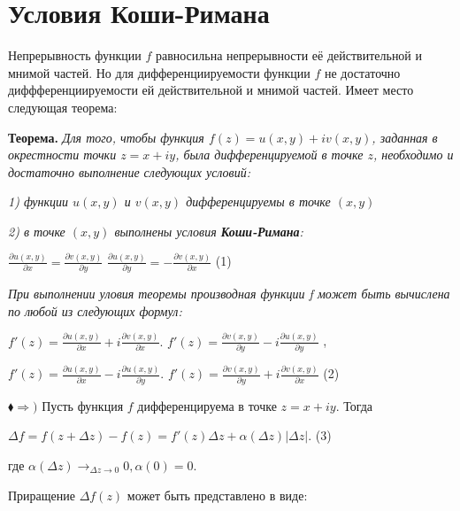 \documentclass[a4paper, 12pt]{report}
\begin{document}
\section{Условия Коши-Римана}
Непрерывность функции $f$ равносильна непрерывности её действительной и мнимой частей. Но для дифференциируемости функции $f$ не достаточно диффференциируемости ей действительной и мнимой частей. Имеет место следующая теорема:
\par\bigskip
\textbf{Теорема.} \quad
\textsl{Для того, чтобы функция $f(z) = u(x, y) + iv(x, y)$, заданная в окрестности точки $z = x + iy$, была дифференцируемой в точке $z$, необходимо и достаточно выполнение следующих условий: }
\par\bigskip
\textsl{1) функции $u(x, y)$ и $v(x, y)$ дифференцируемы в точке $(x, y)$}
\par
\textsl{2) в точке $(x, y)$ выполнены условия \textbf{Коши-Римана}:}
\par\bigskip
\begin{center}
$\frac{\partial u(x, y)}{\partial x} = \frac{\partial v(x, y)}{\partial y}$ \quad $ \frac{\partial u(x, y)}{\partial y} = -\frac{\partial v(x, y)}{\partial x}$ 
\quad(1)
\end{center}
\par\bigskip
\textsl{При выполнении уловия теоремы производная функции f может быть вычислена по любой из следующих формул:}
\par\bigskip
\begin{center}
$f'(z) = \frac{\partial u(x, y)}{\partial x} + i\frac{\partial v(x, y)}{\partial x}.$ \quad $ f'(z) = \frac{\partial v(x, y)}{\partial y} - i\frac{\partial u(x, y)}{\partial y}$ , 
\par\bigskip
$f'(z) = \frac{\partial u(x, y)}{\partial x} - i\frac{\partial u(x, y)}{\partial y}.$ \quad  $ f'(z) = \frac{\partial v(x, y)}{\partial y} + i\frac{\partial v(x, y)}{\partial x}$  (2)
\end{center}
\par\bigskip
$\blacklozenge \Rightarrow )$ Пусть функция $f$ дифференцируема в точке $z = x + iy$. Тогда 
\par\bigskip
\begin{center}
    $\Delta f = f(z + \Delta z) - f(z) = f'(z)\Delta z + \alpha (\Delta z)|\Delta z|$.  (3)
\end{center}
\par\bigskip
где $\alpha(\Delta z) \to_{\Delta z \to 0} 0, \alpha (0) = 0$.
\par
Приращение $\Delta f(z)$ может быть представлено в виде: 
\end{document}
